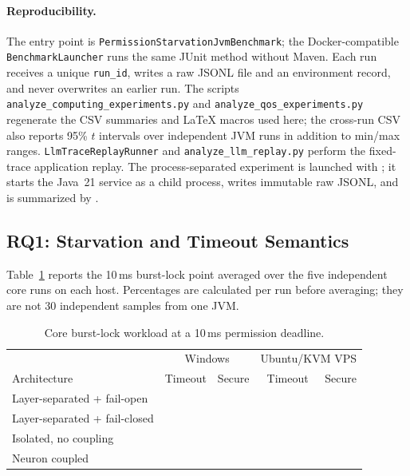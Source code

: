\paragraph{Reproducibility.}
The entry point is
\texttt{PermissionStarvationJvmBenchmark}; the Docker-compatible
\texttt{BenchmarkLauncher} runs the same JUnit method without Maven. Each
run receives a unique \texttt{run\_id}, writes a raw JSONL file and an
environment record, and never overwrites an earlier run. The scripts
\texttt{analyze\_computing\_experiments.py} and
\texttt{analyze\_qos\_experiments.py} regenerate the CSV summaries and
LaTeX macros used here; the cross-run CSV also reports 95\% $t$ intervals
over independent JVM runs in addition to min/max ranges.
\texttt{LlmTraceReplayRunner} and
\texttt{analyze\_llm\_replay.py} perform the fixed-trace application replay.
The process-separated experiment is launched with
; it
starts the Java~21 service as a child process, writes immutable raw JSONL, and
is summarized by .

\subsection{RQ1: Starvation and Timeout Semantics}

Table~\ref{tab:ten-ms} reports the 10\,ms burst-lock point averaged over the
five independent core runs on each host. Percentages are calculated per run
before averaging; they are not 30 independent samples from one JVM.

\begin{table}[t]
\centering
\small
\caption{Core burst-lock workload at a 10\,ms permission deadline.}
\label{tab:ten-ms}
\begin{tabular}{lrrrr}
\toprule
 & \multicolumn{2}{c}{Windows} & \multicolumn{2}{c}{Ubuntu/KVM VPS} \\
Architecture & Timeout & Secure & Timeout & Secure \\
\midrule
Layer-separated + fail-open   & \ComputingwindowslocalFailOpenTimeout{} & \ComputingwindowslocalFailOpenSecure{} & \ComputingvpsubuntukvmFailOpenTimeout{} & \ComputingvpsubuntukvmFailOpenSecure{} \\
Layer-separated + fail-closed & \ComputingwindowslocalFailClosedTimeout{} & \ComputingwindowslocalFailClosedSecure{} & \ComputingvpsubuntukvmFailClosedTimeout{} & \ComputingvpsubuntukvmFailClosedSecure{} \\
Isolated, no coupling         & \ComputingwindowslocalIsolatedTimeout{} & \ComputingwindowslocalIsolatedSecure{} & \ComputingvpsubuntukvmIsolatedTimeout{} & \ComputingvpsubuntukvmIsolatedSecure{} \\
Neuron coupled                & \ComputingwindowslocalCoupledTimeout{} & \ComputingwindowslocalCoupledSecure{} & \ComputingvpsubuntukvmCoupledTimeout{} & \ComputingvpsubuntukvmCoupledSecure{} \\
\bottomrule
\end{tabular}
\end{table}

